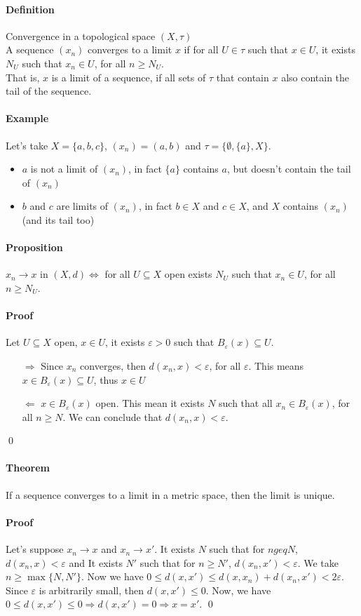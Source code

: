 \documentclass{article}
\newcommand{\Ep}{\varepsilon}
\newcommand{\Def}{\paragraph{Definition}}
\newcommand{\Proposition}{\paragraph{Proposition}}
\newcommand{\Theorem}{\paragraph{Theorem}}
\newcommand{\Proof}{\paragraph{Proof}}
\newcommand{\Example}{\paragraph{Example}}
\begin{document}
	\Def Convergence in a topological space $(X, \tau)$
\\A sequence $(x_n)$ converges to a limit $x$ if for all $U \in \tau$ such that
	$x \in U$, it exists $N_U$ such that $x_n \in U$, for all $n \geq N_U$.
\\That is, $x$ is a limit of a sequence, if all sets of $\tau$ that contain $x$
	also contain the tail of the sequence.

	\Example Let's take $X = \{ a, b, c \}$, $(x_n) = (a, b)$ and $\tau =
	\{ \emptyset, \{ a \}, X \}$.
	\begin{itemize}
		\item $a$ is not a limit of $(x_n)$, in fact $\{ a \}$ contains $a$, but
		doesn't contain the tail of $(x_n)$
		\item $b$ and $c$ are limits of $(x_n)$, in fact $b \in X$ and $c \in X$,
		and $X$ contains $(x_n)$ (and its tail too)
	\end{itemize}

	\Proposition $x_n \to x$ in $(X, d) \iff$ for all $U \subseteq X$ open exists
	$N_U$ such that $x_n \in U$, for all $n \geq N_U$.

	\Proof Let $U \subseteq X$ open, $x \in U$, it exists $\Ep > 0$ such that
	$B_\Ep(x) \subseteq U$.
	\begin{itemize}
		\item[$\Rightarrow$] Since $x_n$ converges, then $d(x_n,x) < \Ep$, for
		all $\Ep$. This means $x \in B_\Ep(x) \subseteq U$, thus $x \in U$
		\item[$\Leftarrow$] $x \in B_\Ep(x)$ open. This mean it exists $N$ such
		that all $x_n \in B_\Ep(x)$, for all $n \geq N$. We can conclude that
		$d(x_n,x) < \Ep$.
	\end{itemize}
	\qed

	\Theorem If a sequence converges to a limit in a metric space, then the limit
	is unique.

	\Proof Let's suppose $x_n \to x$ and $x_n \to x'$.
	It exists $N$ such that for $n geq N$, $d(x_n,x) < \Ep$ and It exists
	$N'$ such that for $n \geq N'$, $d(x_n,x') < \Ep$. We take $n \geq
	\max\{ N, N' \}$. Now we have $0 \leq d(x,x') \leq d(x,x_n) + d(x_n,x') <
	2\Ep$.
\\Since $\Ep$ is arbitrarily small, then $d(x,x') \leq 0$. Now, we have
	$0 \leq d(x,x') \leq 0 \Rightarrow d(x,x') = 0 \Rightarrow x = x'$.
	\qed
\end{document}
